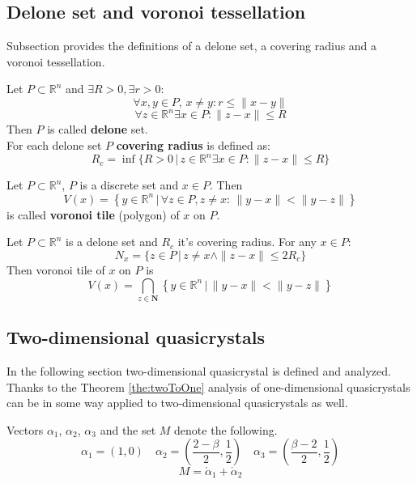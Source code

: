 \documentclass[text.tex]{subfiles}
\begin{document}
\subsection*{Delone set and voronoi tessellation}

Subsection provides the definitions of a delone set, a covering radius and a voronoi tessellation.

\begin{definition}
\label{def:delone}
Let $P\subset \mathbb{R}^n$ and $\exists R>0, \exists r>0$:
$$\forall x,y\in P,\, x\neq y: r\leq \|x-y\|$$
$$\forall z\in\mathbb{R}^n \exists x\in P: \|z-x\|\leq R$$
Then $P$ is called \textbf{delone} set.\\
For each delone set $P$ \textbf{covering radius} is defined as:
$$R_c = \inf\{R>0\,|\, z\in\mathbb{R}^n \exists x\in P: \|z-x\|\leq R\}$$
\end{definition}

\begin{definition}
Let $P\subset \mathbb{R}^n$, $P$ is a discrete set and $x\in P$. Then
$$V(x) = \left\{ y \in \mathbb{R}^n \,|\, \forall z \in P, z\neq x:\, \|y-x\|<\|y-z\| \right\}$$
is called \textbf{voronoi tile} (polygon) of $x$ on $P$.
\end{definition}

\begin{theorem}
\label{the:radiusLimit}
Let $P\subset \mathbb{R}^n$ is a delone set and $R_c$ it's covering radius. For any $x\in P$:
$$N_x = \{z\in P\,|\, z\neq x \wedge \|z-x\|\leq 2R_c\}$$
Then voronoi tile of $x$ on $P$ is
$$V(x) = \bigcap_{z\in \boldsymbol{N}} \left\{ y \in \mathbb{R}^n \,|\, \|y-x\|<\|y-z\| \right\}$$
\end{theorem}

\subsection{Two-dimensional quasicrystals}%
\label{sec:twoDimension}
In the following section two-dimensional quasicrystal is defined and analyzed. Thanks to the Theorem \ref{the:twoToOne} analysis of one-dimensional quasicrystals can be in some way applied to two-dimensional quasicrystals as well. 
\begin{definition}
Vectors $\alpha_1$, $\alpha_2$, $\alpha_3$ and the set $M$ denote the following.
$$\alpha_1 = \left( 1,0 \right) \quad \alpha_2 = \left( \frac{2-\beta}{2}, \frac{1}{2} \right) \quad \alpha_3 = \left( \frac{\beta-2}{2}, \frac{1}{2} \right)$$
$$M = \ring\alpha_1 + \ring\alpha_2$$
\end{definition}
\end{document}

